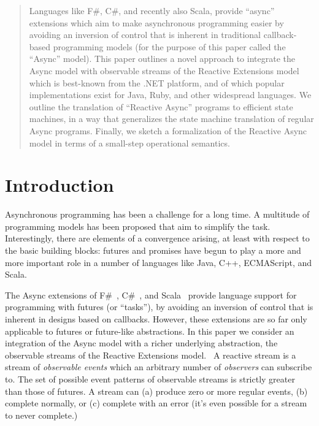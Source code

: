 \documentclass{acm_proc_article-sp}
\begin{document}
\maketitle
\begin{abstract}

Languages like F\#, C\#, and recently also Scala, provide ``async'' extensions
which aim to make asynchronous programming easier by avoiding an inversion of
control that is inherent in traditional callback-based programming models (for
the purpose of this paper called the ``Async'' model). This paper outlines a
novel approach to integrate the Async model with observable streams of the
Reactive Extensions model which is best-known from the .NET platform, and of
which popular implementations exist for Java, Ruby, and other widespread
languages. We outline the translation of ``Reactive Async'' programs to
efficient state machines, in a way that generalizes the state machine
translation of regular Async programs. Finally, we sketch a formalization of
the Reactive Async model in terms of a small-step operational semantics.

\end{abstract}




\section{Introduction}

Asynchronous programming has been a challenge for a long time. A multitude of
programming models has been proposed that aim to simplify the task.
Interestingly, there are elements of a convergence arising, at least with
respect to the basic building blocks: futures and promises have begun to play
a more and more important role in a number of languages like Java, C++,
ECMAScript, and Scala.

The Async extensions of F\#~\cite{SymePL11}, C\#~\cite{FormalizingAsync}, and
Scala~\cite{ScalaAsyncSIP} provide language support for programming with
futures (or ``tasks''), by avoiding an inversion of control that is inherent
in designs based on callbacks. However, these extensions are so far only
applicable to futures or future-like abstractions. In this paper we consider
an integration of the Async model with a richer underlying abstraction, the
observable streams of the Reactive Extensions model.~\cite{RxCACM} A reactive
stream is a stream of {\em observable events} which an arbitrary number of
{\em observers} can subscribe to. The set of possible event patterns of
observable streams is strictly greater than those of futures. A stream can (a) produce zero or more regular events, (b) complete normally, or (c) complete with an error (it's even possible for a stream to never complete.)
\end{document}
